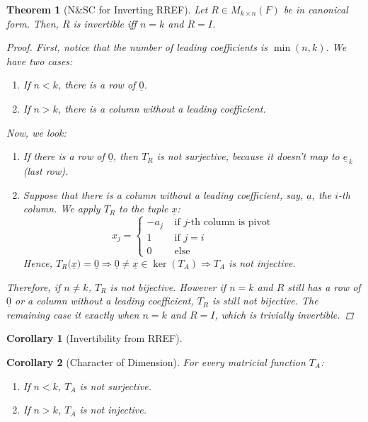 \documentclass[12pt]{article}
\let\RA\Rightarrow
\newcommand{\tuple}[1]{\underline{#1}}
\newtheorem{theorem}{Theorem}[subsection]
\newtheorem{corollary}{Corollary}[subsection]
\begin{document}
\begin{theorem}[N\&SC for Inverting RREF]
  Let $R\in M_{k\times n}(F)$ be in canonical form. Then, $R$ is invertible iff $n=k$ and $R=I$.
  \begin{proof}
    First, notice that the number of leading coefficients is $\min(n,k)$. We have two cases:
    \begin{enumerate}
      \item If $n<k$, there is a row of $\tuple{0}$.
      \item If $n>k$, there is a column without a leading coefficient.
    \end{enumerate}
    Now, we look:
    \begin{enumerate}
      \item If there is a row of $\tuple{0}$, then $T_R$ is not surjective, because it doesn't map to $\tuple{e}_{\,k}$ (last row).
      \item Suppose that there is a column without a leading coefficient, say, $\tuple{a}$, the $i$-th column. We apply $T_R$ to the tuple $\tuple{x}$:
      $$
      x_j=
      \begin{cases}
        -a_j &\text{ if }j\text{-th column is pivot}\\
        1 &\text{ if }j=i\\
        0 &\text{ else}
      \end{cases}
      $$
      Hence, $T_R\big(\tuple{x}\big)=\tuple{0}\RA \tuple{0}\neq \tuple{x}\in\ker(T_A)\RA T_A$ is not injective.
    \end{enumerate}
    Therefore, if $n\neq k$, $T_R$ is not bijective. However if $n=k$ and $R$ still has a row of $\tuple{0}$ or a column without a leading coefficient, $T_R$ is still not bijective. The remaining case it exactly when $n=k$ and $R=I$, which is trivially invertible.
  \end{proof}
\end{theorem}

\begin{corollary}[Invertibility from RREF]
\end{corollary}

\begin{corollary}[Character of Dimension]
  For every matricial function $T_A$:
  \begin{enumerate}
    \item If $n<k$, $T_A$ is not surjective.
    \item If $n>k$, $T_A$ is not injective.
  \end{enumerate}
\end{corollary}
\end{document}
